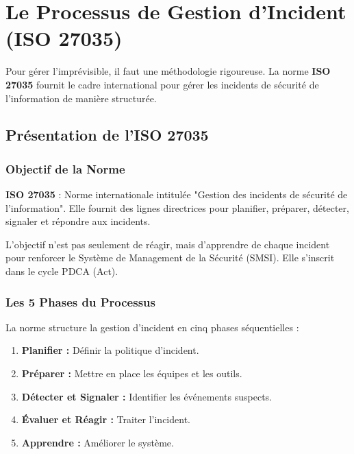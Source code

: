 \chapter{Le Processus de Gestion d'Incident (ISO 27035)}
\label{chap:procincident}

Pour gérer l'imprévisible, il faut une méthodologie rigoureuse. La norme \textbf{ISO 27035} fournit le cadre international pour gérer les incidents de sécurité de l'information de manière structurée.

\section{Présentation de l'ISO 27035}

\subsection{Objectif de la Norme}

\begin{boxdef}
\textbf{ISO 27035} : Norme internationale intitulée "Gestion des incidents de sécurité de l'information". Elle fournit des lignes directrices pour planifier, préparer, détecter, signaler et répondre aux incidents.
\end{boxdef}

L'objectif n'est pas seulement de réagir, mais d'apprendre de chaque incident pour renforcer le Système de Management de la Sécurité (SMSI). Elle s'inscrit dans le cycle PDCA (Act).

\subsection{Les 5 Phases du Processus}

La norme structure la gestion d'incident en cinq phases séquentielles :

\begin{enumerate}
    \item \textbf{Planifier :} Définir la politique d'incident.
    \item \textbf{Préparer :} Mettre en place les équipes et les outils.
    \item \textbf{Détecter et Signaler :} Identifier les événements suspects.
    \item \textbf{Évaluer et Réagir :} Traiter l'incident.
    \item \textbf{Apprendre :} Améliorer le système.
\end{enumerate}

